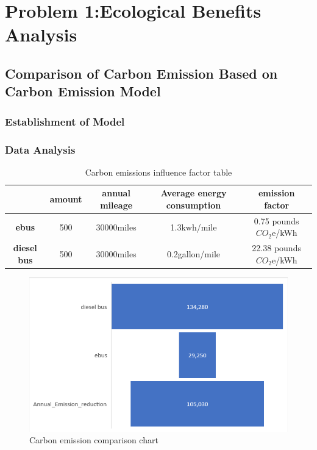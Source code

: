 \documentclass[12pt]{article}
\begin{document}
\section{Problem 1:Ecological Benefits Analysis}
\subsection{Comparison of Carbon Emission Based on Carbon Emission Model}
\subsubsection{Establishment of Model}
\subsubsection{Data Analysis}
\begin{table}[!htbp]
	\centering
	\caption{Carbon emissions influence factor table}
	\begin{tabular}{|c|c|c|c|c|}
	\hline
	  &\textbf{amount} & \textbf{annual mileage} &\textbf{Average energy consumption}&\textbf{emission factor}\\
	\hline
	\textbf{ebus} & 500 & 30000miles&1.3kwh/mile&0.75 pounds $CO_\text{2}$e/kWh\\
	\hline
	\textbf{diesel bus} &500&30000miles&0.2gallon/mile&22.38 pounds $CO_\text{2}$e/kWh\\
	\hline
	\end{tabular}
\end{table}

\begin{figure}[H]
	\centering
	\includegraphics[scale=0.7]{Bar chart.png}%
	\caption{Carbon emission comparison chart} %
\end{figure}
\end{document}
